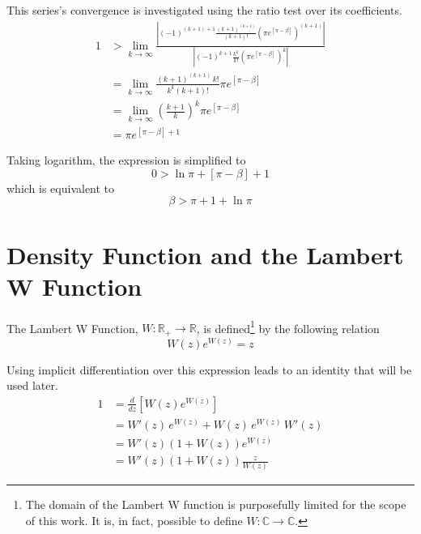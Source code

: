 \documentclass{article}
\newcommand{\R}{\mathbb{R}}
\newcommand{\aabs}[1]{\left| #1 \right|}
\newcommand{\ppar}[1]{\left( #1 \right)}
\newcommand{\spar}[1]{\left[ #1 \right]}
\begin{document}
This series's convergence is investigated using the ratio test over its coefficients.
\begin{align*}
    1 &>
    \lim_{k\rightarrow \infty}
    \frac{\aabs{
    (-1)^{\ppar{k+1}+1} \frac{\ppar{k+1}^{\ppar{k+1}}}{\ppar{k+1}!} 
    \ppar{\pi
    e^{\spar{\pi-\beta}} }^{\ppar{k+1}}
    }}{\aabs{
    (-1)^{k+1} \frac{k^k}{k!} 
    \ppar{\pi
    e^{\spar{\pi-\beta}} }^k
    }}
    \\
    &=
    \lim_{k\rightarrow \infty}
    {
    \frac{\ppar{k+1}^{\ppar{k+1}}\, k! }{{k}^{k} \ppar{k+1}!}
    {\pi e^{\spar{\pi-\beta}} }
    }
    \\
    &=
    \lim_{k\rightarrow \infty}
    \ppar{\frac{k+1}{k}}^k {\pi e^{\spar{\pi-\beta}} }
    \\
    &=
    {\pi e^{\spar{\pi-\beta}+1} }
\end{align*}

Taking logarithm, the expression is simplified to
\begin{equation}
    0 > \ln{\pi} + \spar{\pi-\beta}+1
\end{equation}
which is equivalent to
\begin{equation}
    \beta > \pi + 1 + \ln{\pi}
\end{equation}

\section{Density Function and the Lambert W Function}
\label{ap:identities}

The Lambert W Function, $W: \R_+\rightarrow \R$, is defined\footnote{The domain of the Lambert W function is purposefully limited for the scope of this work. It is, in fact, possible to define $W: \mathbb{C}\rightarrow \mathbb{C}$.} by the following relation
\begin{equation}
    W(z) e^{W(z)} = z
\end{equation}

Using implicit differentiation over this expression leads to an identity that will be used later.
\begin{align*}
    1 &=
    \frac{d}{d z} \spar{W(z) e^{W(z)}}
    \\ &=
    W'(z)\, e^{W(z)} + W(z)\, e^{W(z)}\, W'(z)
    \\ &=
    W'(z) \ppar{1+W\ppar{z}} e^{W(z)}
    \\ &=
    W'(z) \ppar{1+W\ppar{z}} \frac{z}{W(z)}
\end{align*}
\end{document}
